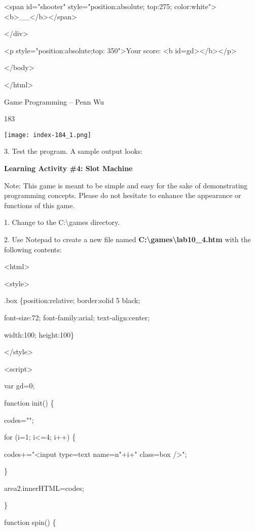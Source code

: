 \documentclass[
]{article}
\begin{document}
\textless span id="shooter" style="position:absolute; top:275;
color:white"\textgreater\textless b\textgreater\_\textbar\_\textless/b\textgreater\textless/span\textgreater{}

\textless/div\textgreater{}

\textless p style="position:absolute;top: 350"\textgreater Your score:
\textless b
id=gd\textgreater\textless/b\textgreater\textless/p\textgreater{}

\textless/body\textgreater{}

\textless/html\textgreater{}

Game Programming -- Penn Wu

183

\protect\hypertarget{index_split_011.htmlux5cux23p184}{}{}\texttt{[image: index-184\_1.png]}

3. Test the program. A sample output looks:

\textbf{Learning Activity \#4: Slot Machine}

Note: This game is meant to be simple and easy for the sake of
demonstrating programming concepts. Please do not hesitate to enhance
the appearance or functions of this game.

1. Change to the C:\textbackslash games directory.

2. Use Notepad to create a new file named
\textbf{C:\textbackslash games\textbackslash lab10\_4.htm} with the
following contents:

\textless html\textgreater{}

\textless style\textgreater{}

.box \{position:relative; border:solid 5 black;

font-size:72; font-family:arial; text-align:center;

width:100; height:100\}

\textless/style\textgreater{}

\textless script\textgreater{}

var gd=0;

function init() \{

codes="";

for (i=1; i\textless=4; i++) \{

codes+="\textless input type=text name=n"+i+"
class=\textquotesingle box\textquotesingle{} /\textgreater";

\}

area2.innerHTML=codes;

\}

function spin() \{
\end{document}
